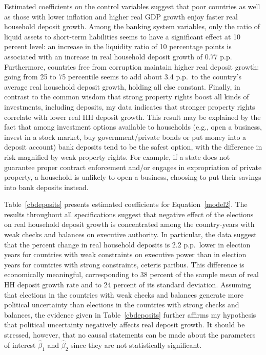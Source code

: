 \documentclass[12pt,a4paper]{article}
\begin{document}

Estimated coefficients on the control variables suggest that poor countries as well as those with lower inflation and higher real GDP growth enjoy faster real household deposit growth. Among the banking system variables, only the ratio of liquid assets to short-term liabilities seems to have a significant effect at 10 percent level: an increase in the liquidity ratio of 10 percentage points is associated with an increase in real household deposit growth of 0.77 p.p. Furthermore, countries free from corruption maintain higher real deposit growth: going from 25 to 75 percentile seems to add about 3.4 p.p.\ to the country's average real household deposit growth, holding all else constant. Finally, in contrast to the common wisdom that strong property rights boost all kinds of investments, including deposits, my data indicates that stronger property rights correlate with lower real HH deposit growth. This result may be explained by the fact that among investment options available to households (e.g., open a business, invest in a stock market, buy government/private bonds or put money into a deposit account) bank deposits tend to be the safest option, with the difference in risk magnified by weak property rights. For example, if a state does not guarantee proper contract enforcement and/or engages in expropriation of private property, a household is unlikely to open a business, choosing to put their savings into bank deposits instead.


Table~\ref{cbdeposits} presents estimated coefficients for Equation~\ref{model2}. The results throughout all specifications suggest that negative effect of the elections on real household deposit growth is concentrated among the country-years with weak checks and balances on executive authority. In particular, the data suggest that the percent change in real household deposits is 2.2 p.p.\ lower in election years for countries with weak constraints on executive power than in election years for countries with strong constraints, ceteris paribus. This difference is economically meaningful, corresponding to 38 percent of the sample mean of real HH deposit growth rate and to 24 percent of its standard deviation. Assuming that elections in the countries with weak checks and balances generate more political uncertainty than elections in the countries with strong checks and balances, the evidence given in Table~\ref{cbdeposits} further affirms my hypothesis that political uncertainty negatively affects real deposit growth. It should be stressed, however, that no causal statements can be made about the parameters of interest $\hat{\beta}_1$ and $\hat{\beta}_2$ since they are not statistically significant.
\end{document}
